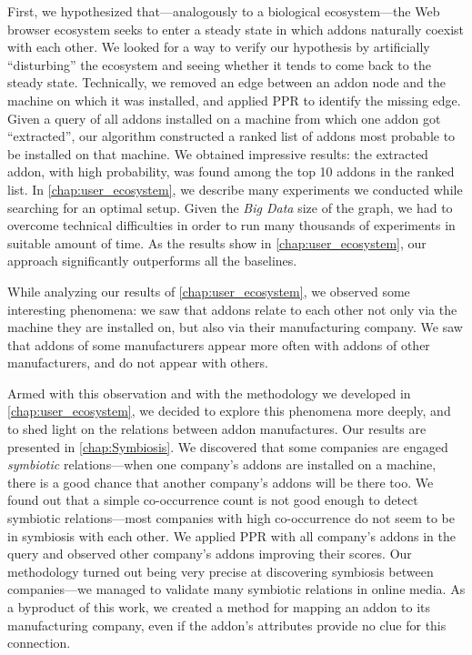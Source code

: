 \documentclass[ijoc,nonblindrev]{informs3} %
\numberwithin{equation}{subsection}
\begin{document}
First, we hypothesized that---analogously to a biological ecosystem---the Web browser ecosystem seeks to enter a steady state in which addons naturally coexist with each other. We looked for a way to verify our hypothesis by artificially ``disturbing'' the ecosystem and seeing whether it tends to come back to the steady state. Technically, we removed an edge between an addon node and the machine on which it was installed, and applied PPR to identify the missing edge. Given a query of all addons installed on a machine from which one addon got ``extracted'', our algorithm constructed a ranked list of addons most probable to be installed on that machine. We obtained impressive results: the extracted addon, with high probability, was found among the top 10 addons in the ranked list. In \autoref{chap:user_ecosystem}, we describe many experiments we conducted while searching for an optimal setup. Given the \emph{Big Data} size of the graph, we had to overcome technical difficulties in order to run many thousands of experiments in suitable amount of time. As the results show in \autoref{chap:user_ecosystem}, our approach significantly outperforms all the baselines.

While analyzing our results of \autoref{chap:user_ecosystem}, we observed some interesting phenomena: we saw that addons relate to each other not only via the machine they are installed on, but also via their manufacturing company. We saw that addons of some manufacturers appear more often with addons of other manufacturers, and do not appear with others.

Armed with this observation and with the methodology we developed in \autoref{chap:user_ecosystem}, we decided to explore this phenomena more deeply, and to shed light on the relations between addon manufactures. Our results are presented in \autoref{chap:Symbiosis}.
We discovered that some companies are engaged \emph{symbiotic} relations---when one company's addons are installed on a machine, there is a good chance that another company's addons will be there too. We found out that a simple co-occurrence count is not good enough to detect symbiotic relations---most companies with high co-occurrence do not seem to be in symbiosis with each other. We applied PPR with all company's addons in the query and observed other company's addons improving their scores. Our methodology turned out being very precise at discovering symbiosis between companies---we managed to validate many symbiotic relations in online media. As a byproduct of this work, we created a method for mapping an addon to its manufacturing company, even if the addon's attributes provide no clue for this connection.
\end{document}
